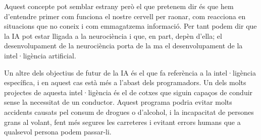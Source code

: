 Aquest concepte pot semblar estrany però el que pretenem dir és que hem d'entendre primer com funciona el nostre cervell
per raonar, com reacciona en situacions que no coneix i com emmagatzema informació. Per tant podem dir que la IA pot estar lligada a la neurociència i que, en part,
depèn d'ella; el desenvolupament de la neurociència porta de la ma el desenvolupament de la intel·ligència artificial.


Un altre dels objectius de futur de la IA és el que fa referència a la intel·ligència específica, i en aquest cas està més a l'abast dels programadors. Un dels molts projectes de aquesta
intel·ligència és el de cotxes que siguin capaços de conduir sense la necessitat de un conductor. Aquest programa podria evitar molts accidents causats pel consum de drogues o
d'alcohol, i la incapacitat de persones grans al volant, fent més segures les carreteres i evitant errors humans que a qualsevol persona podem passar-li.



